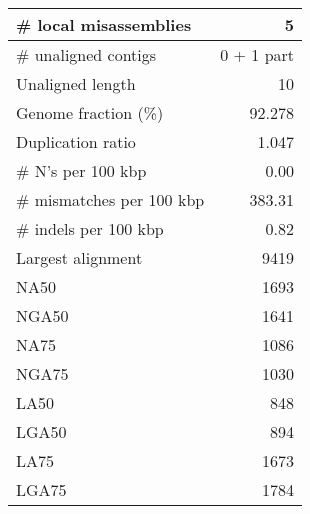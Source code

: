 \documentclass[12pt,a4paper]{article}
\begin{document}
\begin{table}[ht]
\begin{center}
\begin{tabular}{|l*{1}{|r}|}
\# local misassemblies & 5 \\ \hline
\# unaligned contigs & 0 + 1 part \\ \hline
Unaligned length & 10 \\ \hline
Genome fraction (\%) & 92.278 \\ \hline
Duplication ratio & 1.047 \\ \hline
\# N's per 100 kbp & 0.00 \\ \hline
\# mismatches per 100 kbp & 383.31 \\ \hline
\# indels per 100 kbp & 0.82 \\ \hline
Largest alignment & 9419 \\ \hline
NA50 & 1693 \\ \hline
NGA50 & 1641 \\ \hline
NA75 & 1086 \\ \hline
NGA75 & 1030 \\ \hline
LA50 & 848 \\ \hline
LGA50 & 894 \\ \hline
LA75 & 1673 \\ \hline
LGA75 & 1784 \\ \hline
\end{tabular}
\end{center}
\end{table}
\end{document}
